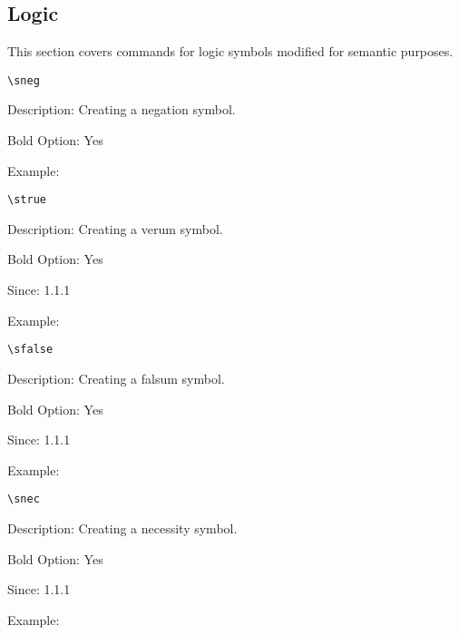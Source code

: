\documentclass[10pt, a4paper]{article}
\newenvironment{itemizeexamplecommand}{
	\begin{itemize}
		\setlength\itemsep{-0.2em}
	}
	{
	\end{itemize}
}
\begin{document}
	\subsection{Logic}
	This section covers commands for logic symbols modified for semantic purposes.
	\pex\begin{itemizeexamplecommand}
			\item[] \begin{lstlisting}[style=B]
			\sneg
			\end{lstlisting}
			{\scriptsize
				\item[] Description: Creating a negation symbol.
				\item[] Bold Option: Yes
				\item[] Example: \sneg}
		\end{itemizeexamplecommand}
	\xe
	\pex\begin{itemizeexamplecommand}
			\item[] \begin{lstlisting}[style=B]
			\strue
			\end{lstlisting}
			{\scriptsize
				\item[] Description: Creating a verum symbol.
				\item[] Bold Option: Yes
				\item[] Since: 1.1.1
				\item[] Example: \strue}
		\end{itemizeexamplecommand}
	\xe
	\pex\begin{itemizeexamplecommand}
			\item[] \begin{lstlisting}[style=B]
			\sfalse
			\end{lstlisting}
			{\scriptsize
				\item[] Description: Creating a falsum symbol.
				\item[] Bold Option: Yes
				\item[] Since: 1.1.1
				\item[] Example: \sfalse}
		\end{itemizeexamplecommand}
	\xe
	\pex\begin{itemizeexamplecommand}
			\item[] \begin{lstlisting}[style=B]
			\snec
			\end{lstlisting}
			{\scriptsize
				\item[] Description: Creating a necessity symbol.
				\item[] Bold Option: Yes
				\item[] Since: 1.1.1
				\item[] Example: \snec}
		\end{itemizeexamplecommand}
\end{document}
